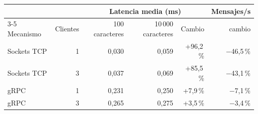 \begin{tabular}{lrrrrr}
\toprule
 & & \multicolumn{3}{c}{Latencia media (ms)} & Mensajes/s \\
\cmidrule(lr){3-5}
Mecanismo & Clientes & 100 caracteres & 10\,000 caracteres & Cambio & cambio \\
\midrule
Sockets TCP & 1 & 0,030 & 0,059 & +96,2\,\% & $-$46,5\,\% \\
Sockets TCP & 3 & 0,037 & 0,069 & +85,5\,\% & $-$43,1\,\% \\
gRPC & 1 & 0,231 & 0,250 & +7,9\,\% & $-$7,1\,\% \\
gRPC & 3 & 0,265 & 0,275 & +3,5\,\% & $-$3,4\,\% \\
\bottomrule
\end{tabular}
